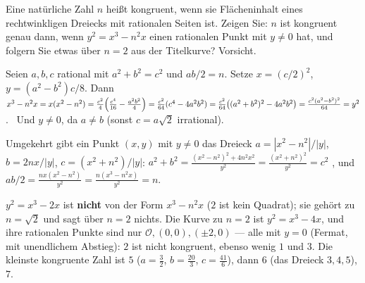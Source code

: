 \begin{aufgabe}
Eine natürliche Zahl $n$ heißt kongruent, wenn sie Flächeninhalt eines rechtwinkligen Dreiecks mit rationalen Seiten ist. Zeigen Sie: $n$ ist kongruent genau dann, wenn $y^{2} = x^{3} - n^{2}x$ einen rationalen Punkt mit $y\ne0$ hat, und folgern Sie etwas über $n = 2$ aus der Titelkurve? Vorsicht.

\loesung
{}
Seien $a, b, c$ rational mit $a^{2} + b^{2} = c^{2}$ und $ab/2 = n$. Setze $x = (c/2)^{2}$, $y = (a^{2} - b^{2})c/8$. Dann $x^{3} - n^{2}x = x(x^{2} - n^{2}) = \frac{c^{2}}{4}\Bigl(\frac{c^{4}}{16} - \frac{a^{2}b^{2}}{4}\Bigr) = \frac{c^{2}}{64}(c^{4} - 4a^{2}b^{2}) = \frac{c^{2}}{64}\bigl((a^{2} + b^{2})^{2} - 4a^{2}b^{2}\bigr) = \frac{c^{2}(a^{2} - b^{2})^{2}}{64} = y^{2}$. \checkmark\ Und $y\ne0$, da $a\ne b$ (sonst $c = a\sqrt2$ irrational).

Umgekehrt gibt ein Punkt $(x, y)$ mit $y\ne0$ das Dreieck $a = |x^{2} - n^{2}|/|y|$, $b = 2nx/|y|$, $c = (x^{2} + n^{2})/|y|$: $a^{2} + b^{2} = \frac{(x^{2} - n^{2})^{2} + 4n^{2}x^{2}}{y^{2}} = \frac{(x^{2} + n^{2})^{2}}{y^{2}} = c^{2}$ \checkmark, und $ab/2 = \frac{n x(x^{2} - n^{2})}{y^{2}} = \frac{n(x^{3} - n^{2}x)}{y^{2}} = n$. \checkmark

$y^{2} = x^{3} - 2x$ ist \textbf{nicht} von der Form $x^{3} - n^{2}x$ ($2$ ist kein Quadrat); sie gehört zu $n = \sqrt2$ und sagt über $n = 2$ nichts. Die Kurve zu $n = 2$ ist $y^{2} = x^{3} - 4x$, und ihre rationalen Punkte sind nur $\mathcal O, (0, 0), (\pm2, 0)$ --- alle mit $y = 0$ (Fermat, mit unendlichem Abstieg): $2$ ist nicht kongruent, ebenso wenig $1$ und $3$. Die kleinste kongruente Zahl ist $5$ ($a = \tfrac32$, $b = \tfrac{20}{3}$, $c = \tfrac{41}{6}$), dann $6$ (das Dreieck $3, 4, 5$), $7$.

\begin{center}
\begin{minipage}{0.88\textwidth}
\end{minipage}
\end{center}
\end{aufgabe}

